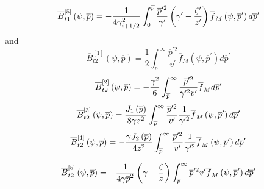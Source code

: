 \begin{equation}
\overline{B}_{t1}^{\left[ 5\right] }\left( \psi ,\overline{p}\right) =-\frac{%
1}{4\gamma _{i+1/2}^{2}}\int_{0}^{\overline{p}}\frac{\overline{p}^{\prime 2}%
}{\gamma ^{\prime }}\left( \gamma ^{\prime }-\frac{\zeta ^{\prime }}{%
z^{\prime }}\right) \overline{f}_{M}\left( \psi ,\overline{p}^{\prime
}\right) d\overline{p}^{\prime }
\end{equation}
and
\begin{equation}
\overline{B}_{t2}^{\left[ 1\right] }\left( \psi ,\overline{p}\right) =\frac{1%
}{2}\int_{\overline{p}}^{\infty }\frac{\overline{p}^{\prime 2}}{v^{\prime }}%
\overline{f}_{M}\left( \psi ,\overline{p}^{\prime }\right) d\overline{p}%
^{\prime }
\end{equation}
\begin{equation}
\overline{B}_{t2}^{\left[ 2\right] }\left( \psi ,\overline{p}\right) =-\frac{%
\gamma ^{2}}{6}\int_{\overline{p}}^{\infty }\frac{\overline{p}^{\prime 2}}{%
\gamma ^{\prime 2}v^{\prime }}\overline{f}_{M}d\overline{p}^{\prime }
\end{equation}
\begin{equation}
\overline{B}_{t2}^{\left[ 3\right] }\left( \psi ,\overline{p}\right) =\frac{%
J_{1}\left( \overline{p}\right) }{8\gamma z^{2}}\int_{\overline{p}}^{\infty }%
\frac{\overline{p}^{\prime 2}}{v^{\prime }}\frac{1}{\gamma ^{\prime 2}}%
\overline{f}_{M}\left( \psi ,\overline{p}^{\prime }\right) d\overline{p}%
^{\prime }
\end{equation}
\begin{equation}
\overline{B}_{t2}^{\left[ 4\right] }\left( \psi ,\overline{p}\right) =-\frac{%
\gamma J_{2}\left( \overline{p}\right) }{4z^{2}}\int_{\overline{p}}^{\infty }%
\frac{\overline{p}^{\prime 2}}{v^{\prime }}\frac{1}{\gamma ^{\prime 2}}%
\overline{f}_{M}\left( \psi ,\overline{p}^{\prime }\right) d\overline{p}%
^{\prime }
\end{equation}

\begin{equation}
\overline{B}_{t2}^{\left[ 5\right] }\left( \psi ,\overline{p}\right) =-\frac{%
1}{4\gamma \overline{p}^{2}}\left( \gamma -\frac{\zeta }{z}\right) \int_{%
\overline{p}}^{\infty }\overline{p}^{\prime 2}v^{\prime }\overline{f}%
_{M}\left( \psi ,\overline{p}^{\prime }\right) d\overline{p}^{\prime }
\end{equation}

